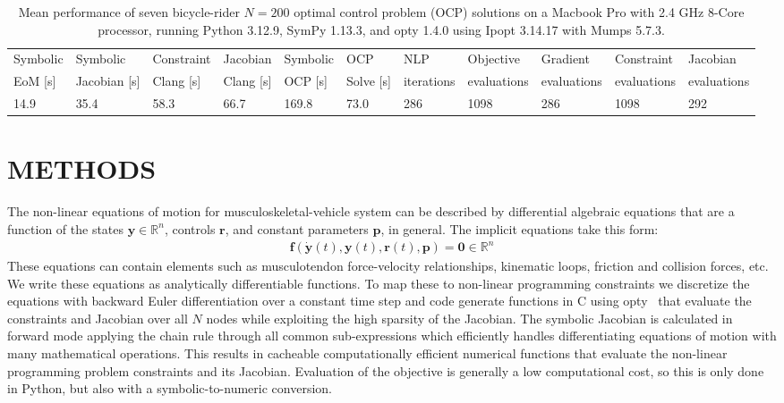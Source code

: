 \documentclass[11pt,twocolumn]{article}
\begin{document}
\begin{table}[t]
  \centering
  \caption{\small Mean performance of seven bicycle-rider \(N=200\) optimal
  control problem (OCP) solutions on a Macbook Pro with 2.4 GHz 8-Core
  processor, running Python 3.12.9, SymPy 1.13.3, and opty 1.4.0 using Ipopt
  3.14.17 with Mumps 5.7.3.}
  \scriptsize
  \begin{tabular}{lllllllllll}
    \toprule
    Symbolic &
    Symbolic &
    Constraint &
    Jacobian &
    Symbolic &
    OCP &
    NLP &
    Objective &
    Gradient &
    Constraint &
    Jacobian
    \\
    EoM [s] &
    Jacobian [s] &
    Clang [s] &
    Clang [s] &
    OCP [s] &
    Solve [s] &
    iterations &
    evaluations &
    evaluations &
    evaluations &
    evaluations
    \\
    \midrule
    14.9 &
    35.4 &
    58.3 &
    66.7 &
    169.8 &
    73.0 &
    286 &
    1098 &
    286 &
    1098 &
    292
    \\
    \bottomrule
  \end{tabular}
  \label{tab:performance}
\end{table}

\vspace{-1.5em}
\section*{METHODS}
\vspace{-1em}
%
The non-linear equations of motion for musculoskeletal-vehicle system can be
described by differential algebraic equations that are a function of the states
\(\mathbf{y} \in \mathbb{R}^n\), controls \(\mathbf{r}\), and constant
parameters \(\mathbf{p}\), in general. The implicit equations take this form:
%
\begin{align}
  \mathbf{f}(\dot{\mathbf{y}}(t), \mathbf{y}(t), \mathbf{r}(t), \mathbf{p}) =
  \mathbf{0} \in \mathbb{R}^n
\end{align}
%
These equations can contain elements such as musculotendon force-velocity
relationships, kinematic loops, friction and collision forces, etc. We write
these equations as analytically differentiable functions. To map these to
non-linear programming constraints we discretize the equations with backward
Euler differentiation over a constant time step and code generate functions in
C using opty~\cite{Moore2018} that evaluate the constraints and Jacobian over
all \(N\) nodes while exploiting the high sparsity of the Jacobian. The
symbolic Jacobian is calculated in forward mode applying the chain rule through
all common sub-expressions which efficiently handles differentiating equations
of motion with many mathematical operations. This results in cacheable
computationally efficient numerical functions that evaluate the non-linear
programming problem constraints and its Jacobian. Evaluation of the objective is
generally a low computational cost, so this is only done in Python, but also
with a symbolic-to-numeric conversion.
\end{document}
